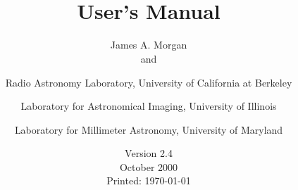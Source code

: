%
%
\makeindex
%
\title{\wip\\ User's Manual}
%
\author{James A. Morgan\\
        and \\
   \and
        Radio Astronomy Laboratory, University of California at Berkeley \\
   \and
        Laboratory for Astronomical Imaging, University of Illinois \\
   \and
        Laboratory for Millimeter Astronomy, University of Maryland
}
%
\date{Version 2.4 \\
   October 2000 \\
   Printed: \today
}
%
%
\setlength{\parindent}{0pt}
\setlength{\parskip}{2.5mm}
%
\addtolength{\textwidth}{1.5in}
\addtolength{\evensidemargin}{-0.75in}
\addtolength{\oddsidemargin}{-0.75in}
%
%
%
\newcommand{\insertplot}[5]{
  \section{#1}
  \small
  \fileverbatim{Examples/#2.wip}
  \normalsize
  \subsection*{#4}
  \footnotesize
  \fileverbatim{#5}
  \normalsize
  \begin{figure}[p]
    \wipplot{#2}
    \caption{#3}
    \mylabel{p:#2}
  \end{figure}
}


